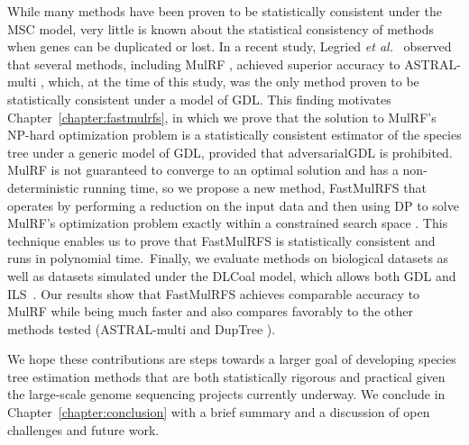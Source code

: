 While many methods have been proven to be statistically consistent under the MSC model, very little is known about the statistical consistency of methods when genes can be duplicated or lost.
In a recent study, Legried {\em et al.}~\cite{legried2020polynomial} observed that several methods, including MulRF \cite{chaudhary2013inferring, chaudhary2014mulrf}, achieved superior accuracy to ASTRAL-multi \cite{rabiee2019multi}, which, at the time of this study, was the only method proven to be statistically consistent under a model of GDL.
This finding motivates Chapter~\ref{chapter:fastmulrfs}, in which we prove that the solution to MulRF's NP-hard optimization problem is a statistically consistent estimator of the species tree under a generic model of GDL, provided that \gls{adversarialGDL} is prohibited.
MulRF is not guaranteed to converge to an optimal solution and has a non-deterministic running time, so we propose a new method, \gls{FastMulRFS} that operates by performing a reduction on the input data and then using DP to solve MulRF's optimization problem exactly within a constrained search space \cite{vachaspati2015fastrfs}. 
This technique enables us to prove that FastMulRFS is statistically consistent and runs in polynomial time.~Finally, we evaluate methods on biological datasets as well as datasets simulated under the \gls{DLCoal} model, which allows both GDL and ILS~\cite{rasmussen2012unified}.
Our results show that FastMulRFS achieves comparable accuracy to MulRF while being much faster and also compares favorably to the other methods tested (ASTRAL-multi and DupTree \cite{wehe2008duptree}).

We hope these contributions are steps towards a larger goal of developing species tree estimation methods that are both statistically rigorous and practical given the large-scale genome sequencing projects currently underway.
We conclude in Chapter~\ref{chapter:conclusion} with a brief summary and a discussion of open challenges and future work.